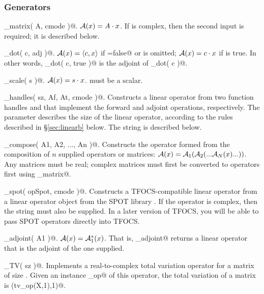 \documentclass{article}
\begin{document}
\subsubsection{Generators}

\begin{trivlist}
\item \verb@linop_matrix( A, cmode )@. $\mathcal{A}(x) = A \cdot x$.
If \verb@A@ is complex, then the second input \verb@cmode@ is required; 
it is described below.
\item \verb@linop_dot( c, adj )@. $\mathcal{A}(x) = \langle c,x\rangle$ if \verb@adj=false@
or \verb@adj@ is omitted; $\mathcal{A}(x) = c \cdot x$ if \verb@adj@ is true. In
other words, \verb@linop_dot( c, true )@ is the adjoint of \verb@linop_dot( c )@.
\item \verb@linop_scale( s )@. $\mathcal{A}(x) = s \cdot x$. \verb@s@ must be a scalar.
\item \verb@linop_handles( sz, Af, At, cmode )@. Constructs a linear operator
from two function handles \verb@Af@ and \verb@At@ that implement the
forward and adjoint operations, respectively. The \verb@sz@ parameter
describes the size of the linear operator, according to the rules
described in \S\ref{sec:linearb} below. The \verb@cmode@ string is
described below.
\item \verb@linop_compose( A1, A2, ..., An )@. Constructs the operator formed from
the composition of $n$ supplied operators or matrices: $\mathcal{A}(x)=\mathcal{A}_1(\mathcal{A}_2(...\mathcal{A}_N(x)...))$.
Any matrices must be real; complex matrices must first be converted to operators
first using \verb@linop_matrix@.
\item \verb@linop_spot( opSpot, cmode )@. Constructs a TFOCS-compatible linear
operator from a linear operator object from the SPOT library \cite{SPOT}.
If the operator is complex, then the \verb@cmode@
string must also be supplied. In a later version of TFOCS, you will be
able to pass SPOT operators directly into TFOCS.
\item \verb@linop_adjoint( A1 )@. $\mathcal{A}(x) = \mathcal{A}_1^*(x)$. That is, \verb@linop_adjoint@
returns a linear operator that is the adjoint of the one supplied.
\item \verb@linop_TV( sz )@. Implements a real-to-complex total variation
operator for a matrix of size \verb@sz@. Given an instance \verb@tv_op@ of
this operator, the total variation of a matrix \verb@X@ is \verb@norm(tv_op(X,1),1)@.
\end{trivlist}
\end{document}
